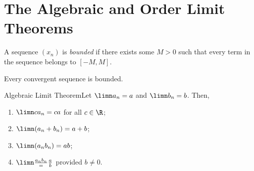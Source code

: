 \renewcommand{\theenumi}{\arabic{enumi}}
\renewcommand{\labelenumi}{\theenumi.}
\section{The Algebraic and Order Limit Theorems}

\begin{definition}
    A sequence \((x_n)\) is \textit{bounded} if there exists some \(M > 0\) such that every term in the sequence belongs to \([-M,M]\).
\end{definition}

\begin{theorem}
    Every convergent sequence is bounded.
\end{theorem}


\begin{ntheorem}
    {Algebraic Limit Theorem}Let \(\limn a_n = a\) and \(\limn b_n = b\). Then,
    \begin{enumerate}[label=(\roman*)]
        \item \(\limn ca_n = ca\) for all \(c \in \R\);
        \item \(\limn (a_n + b_n) = a + b\);
        \item \(\limn (a_nb_n) = ab\);
        \item \(\limn \frac{a_n{b_n}} = \frac{a}{b}\) provided \(b \neq 0\).
    \end{enumerate}
\end{ntheorem}

